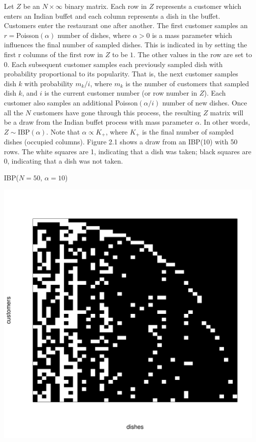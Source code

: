 \noindent
Let $Z$ be an $N \times \infty$ binary matrix. Each row in $Z$ represents a
customer which enters an Indian buffet and each column represents a dish in the
buffet. Customers enter the restaurant one after another. The first customer
samples an $r=$Poisson$(\alpha)$ number of dishes, where $\alpha > 0$ is a mass
parameter which influences the final number of sampled dishes. This is
indicated in by setting the first r columns of the first row in $Z$ to be $1$.
The other values in the row are set to $0$. Each subsequent customer samples
each previously sampled dish with probability proportional to its popularity.
That is, the next customer samples dish $k$ with probability $m_k/i$,
where $m_k$ is the number of customers that sampled dish $k$, and $i$ is the
current customer number (or row number in $Z$). Each customer also samples an
additional Poisson$(\alpha/i)$ number of new dishes. Once all the $N$ customers
have gone through this process, the resulting $Z$ matrix will be a draw from
the Indian buffet process with mass parameter $\alpha$. In other words, $Z \sim
\text{IBP}(\alpha)$. Note that $\alpha \propto K_+$, where $K_+$ is the final
number of sampled dishes (occupied columns). Figure 2.1 shows a draw from an
IBP(10) with 50 rows. The white squares are 1, indicating that a dish was
taken; black squares are 0, indicating that a dish was not taken. \\
\beginmyfig
  \vspace{-15mm}
  \caption{IBP($N=50$, $\alpha=10$)}
  \vspace{-10mm}
  \includegraphics{images/ibp.pdf}
  \vspace{-13mm}
\endmyfig

